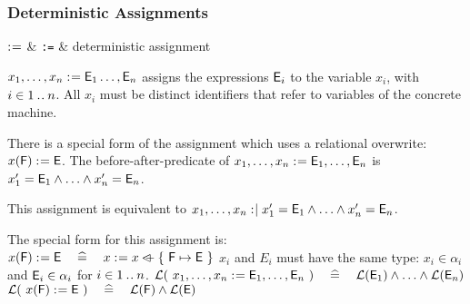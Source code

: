 \newcommand{\eventbassignmentexpr}[1]{\expre_{#1}(\allconstants,\concvariables,\concparameters)}

\begin{samepage}
\subsubsection{Deterministic Assignments}
\label{deterministic_assignments}
\begin{rrnames}
  $\mathrel{:\mkern1mu=}$ & \texttt{:=} & deterministic assignment
\end{rrnames}
\begin{rodinrefentry}
  \rrdesc
    $x_1,\ldots,x_n \mathrel{:\mkern1mu=} \textsf{E}_1\ldots,\textsf{E}_n$
    assigns the expressions $\textsf{E}_i$ to the variable $x_i$, with $i\in1\mathbin{.\mkern1mu.} n$.
    All $x_i$ must be distinct identifiers that refer to variables of the concrete machine.

    There is a special form of the assignment which uses a relational overwrite:\\
    $x(\textsf{F}) \mathrel{:\mkern1mu=} \textsf{E}$.
  \rrdef
    The before-after-predicate of $x_1,\ldots,x_n \mathrel{:\mkern1mu=} \textsf{E}_1,\ldots,\textsf{E}_n$ is\\ $x_1' = \textsf{E}_1 \land \ldots \land x_n' = \textsf{E}_n$.

    This assignment is equivalent to
    $x_1,\ldots,x_n \mathrel{:\mkern1mu\mid} x_1' = \textsf{E}_1 \land \ldots \land x_n' = \textsf{E}_n$.

    The special form for this assignment is:\\
    $x(\textsf{F}) \mathrel{:\mkern1mu=} \textsf{E}
      \quad\mathrel{\widehat=}\quad 
      x \mathrel{:\mkern1mu=} x \mathbin{\lhd\mkern-9mu-} \{~\textsf{F} \mapsto \textsf{E}~\}$
  \rrtypes
    $x_i$ and $E_i$ must have the same type:
    $x_i\in\alpha_i$ and  $\textsf{E}_i\in\alpha_i$ for $i \in 1\mathbin{.\mkern1mu.} n$.
  \rrwd
    $\mathcal{L}(~x_1,\ldots,x_n \mathrel{:\mkern1mu=} \textsf{E}_1,\ldots,\textsf{E}_n~)
      \quad\mathrel{\widehat=}\quad 
      \mathcal{L}(\textsf{E}_1) \land \ldots \land \mathcal{L}(\textsf{E}_n)$ \\
    $\mathcal{L}(~x(\textsf{F}) \mathrel{:\mkern1mu=} \textsf{E}~)
    \quad\mathrel{\widehat=}\quad 
    \mathcal{L}(\textsf{F}) \land \mathcal{L}(\textsf{E})$
\end{rodinrefentry}
\end{samepage}

